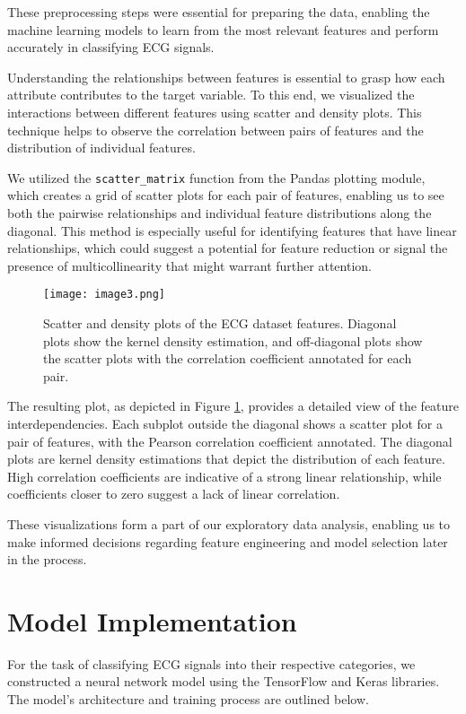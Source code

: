 \documentclass{report}
\begin{document}
These preprocessing steps were essential for preparing the data, enabling the machine learning models to learn from the most relevant features and perform accurately in classifying ECG signals.

Understanding the relationships between features is essential to grasp how each attribute contributes to the target variable. To this end, we visualized the interactions between different features using scatter and density plots. This technique helps to observe the correlation between pairs of features and the distribution of individual features.

We utilized the \texttt{scatter\_matrix} function from the Pandas plotting module, which creates a grid of scatter plots for each pair of features, enabling us to see both the pairwise relationships and individual feature distributions along the diagonal. This method is especially useful for identifying features that have linear relationships, which could suggest a potential for feature reduction or signal the presence of multicollinearity that might warrant further attention.

\begin{figure}[ht]
    \centering
    \texttt{[image: image3.png]}
    \caption{Scatter and density plots of the ECG dataset features. Diagonal plots show the kernel density estimation, and off-diagonal plots show the scatter plots with the correlation coefficient annotated for each pair.}
    \label{fig:scatter_density}
\end{figure}

The resulting plot, as depicted in Figure \ref{fig:scatter_density}, provides a detailed view of the feature interdependencies. Each subplot outside the diagonal shows a scatter plot for a pair of features, with the Pearson correlation coefficient annotated. The diagonal plots are kernel density estimations that depict the distribution of each feature. High correlation coefficients are indicative of a strong linear relationship, while coefficients closer to zero suggest a lack of linear correlation.

These visualizations form a part of our exploratory data analysis, enabling us to make informed decisions regarding feature engineering and model selection later in the process.

\section{Model Implementation}
For the task of classifying ECG signals into their respective categories, we constructed a neural network model using the TensorFlow and Keras libraries. The model's architecture and training process are outlined below.
\end{document}
